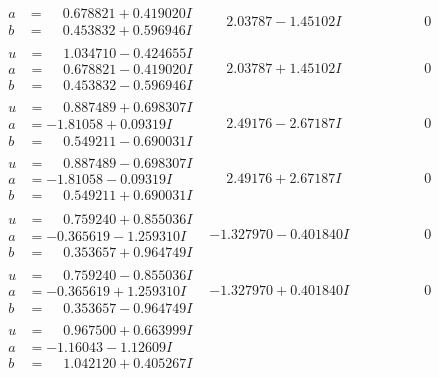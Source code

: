 \documentclass[1p]{elsarticle_modified}
\theoremstyle{definition}
\begin{document}
$$\begin{array}{c|c|c}
\begin{aligned}
a &= \phantom{-}0.678821 + 0.419020 I \\
b &= \phantom{-}0.453832 + 0.596946 I\end{aligned}
 & \phantom{-}2.03787 - 1.45102 I & \phantom{-0.000000 } 0 \\ \hline\begin{aligned}
u &= \phantom{-}1.034710 - 0.424655 I \\
a &= \phantom{-}0.678821 - 0.419020 I \\
b &= \phantom{-}0.453832 - 0.596946 I\end{aligned}
 & \phantom{-}2.03787 + 1.45102 I & \phantom{-0.000000 } 0 \\ \hline\begin{aligned}
u &= \phantom{-}0.887489 + 0.698307 I \\
a &= -1.81058 + 0.09319 I \\
b &= \phantom{-}0.549211 - 0.690031 I\end{aligned}
 & \phantom{-}2.49176 - 2.67187 I & \phantom{-0.000000 } 0 \\ \hline\begin{aligned}
u &= \phantom{-}0.887489 - 0.698307 I \\
a &= -1.81058 - 0.09319 I \\
b &= \phantom{-}0.549211 + 0.690031 I\end{aligned}
 & \phantom{-}2.49176 + 2.67187 I & \phantom{-0.000000 } 0 \\ \hline\begin{aligned}
u &= \phantom{-}0.759240 + 0.855036 I \\
a &= -0.365619 - 1.259310 I \\
b &= \phantom{-}0.353657 + 0.964749 I\end{aligned}
 & -1.327970 - 0.401840 I & \phantom{-0.000000 } 0 \\ \hline\begin{aligned}
u &= \phantom{-}0.759240 - 0.855036 I \\
a &= -0.365619 + 1.259310 I \\
b &= \phantom{-}0.353657 - 0.964749 I\end{aligned}
 & -1.327970 + 0.401840 I & \phantom{-0.000000 } 0 \\ \hline\begin{aligned}
u &= \phantom{-}0.967500 + 0.663999 I \\
a &= -1.16043 - 1.12609 I \\
b &= \phantom{-}1.042120 + 0.405267 I\end{aligned}

\end{array}$$
\end{document}
